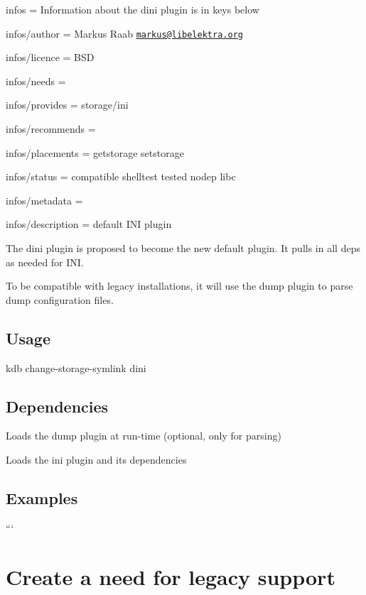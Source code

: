 
\begin{DoxyItemize}
\item infos = Information about the dini plugin is in keys below
\item infos/author = Markus Raab \href{mailto:markus@libelektra.org}{\tt markus@libelektra.\+org}
\item infos/licence = B\+SD
\item infos/needs =
\item infos/provides = storage/ini
\item infos/recommends =
\item infos/placements = getstorage setstorage
\item infos/status = compatible shelltest tested nodep libc
\item infos/metadata =
\item infos/description = default I\+NI plugin
\end{DoxyItemize}

The dini plugin is proposed to become the new default plugin. It pulls in all deps as needed for I\+NI.

To be compatible with legacy installations, it will use the dump plugin to parse dump configuration files.

\subsection*{Usage}


\begin{DoxyCode}
kdb change-storage-symlink dini
\end{DoxyCode}


\subsection*{Dependencies}


\begin{DoxyItemize}
\item Loads the {\ttfamily dump} plugin at run-\/time (optional, only for parsing)
\item Loads the {\ttfamily ini} plugin and its dependencies
\end{DoxyItemize}

\subsection*{Examples}

``` \section*{Create a need for legacy support}

